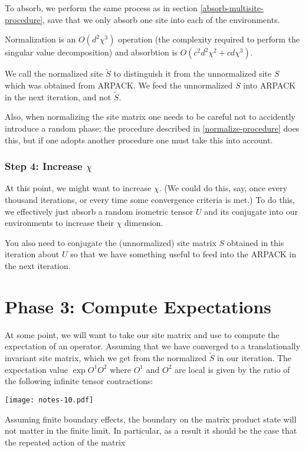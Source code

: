 \documentclass[12pt]{amsart}
\begin{document}
To absorb, we perform the same process as in section \ref{absorb-multisite-procedure}, save that we only absorb one site into each of the environments.

Normalization is an $O(d^2\chi^3)$ operation (the complexity required to perform the singular value decomposition) and absorbtion is $O(c^2d^2\chi^2 + cd\chi^3)$.

We call the normalized site $\tilde S$ to distinguish it from the unnormalized site $S$ which was obtained from ARPACK.  We feed the unnormalized $S$ into ARPACK in the next iteration, and not $\tilde S$.

Also, when normalizing the site matrix one needs to be careful not to accidently introduce a random phase;  the procedure described in \ref{normalize-procedure} does this, but if one adopts another procedure one must take this into account.

\section*{Step 4: Increase $\chi$}

At this point, we might want to increase $\chi$.  (We could do this, say, once every thousand iterations, or every time some convergence criteria is met.)  To do this, we effectively just absorb a random isometric tensor $U$ and its conjugate into our environments to increase their $\chi$ dimension.

You also need to conjugate the (unnormalized) site matrix $S$ obtained in this iteration about $U$ so that we have something useful to feed into the ARPACK in the next iteration.

\part*{Phase 3:  Compute Expectations}

At some point, we will want to take our site matrix and use to compute the expectation of an operator.  Assuming that we have converged to a translationally invariant site matrix, which we get from the normalized $\tilde S$ in our iteration.  The expectation value $\exp{O^1 O^2}$ where $O^1$ and $O^2$ are local is given by the ratio of the following infinite tensor contractions:

    \begin{center}\texttt{[image: notes-10.pdf]}\end{center}

Assuming finite boundary effects, the boundary on the matrix product state will not matter in the finite limit.  In particular, as a result it should be the case that the repeated action of the matrix
\end{document}
